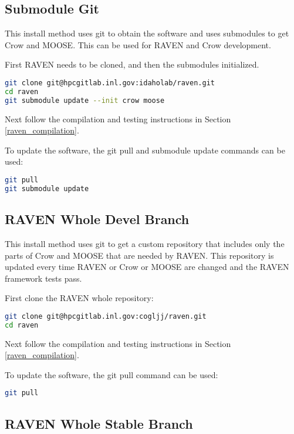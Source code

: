 \subsection{Submodule Git}
\label{submodule_git}

This install method uses git to obtain the software and uses
submodules to get Crow and MOOSE.  This can be used for RAVEN and Crow
development.

First RAVEN needs to be cloned, and then the submodules initialized.

\begin{lstlisting}[language=bash]
git clone git@hpcgitlab.inl.gov:idaholab/raven.git
cd raven
git submodule update --init crow moose
\end{lstlisting}

Next follow the compilation and testing instructions in Section \ref{raven_compilation}.

To update the software, the git pull and submodule update commands can
be used:

\begin{lstlisting}[language=bash]
git pull
git submodule update
\end{lstlisting}


\subsection{RAVEN Whole Devel Branch}
\label{raven_whole_devel}

This install method uses git to get a custom repository that includes
only the parts of Crow and MOOSE that are needed by RAVEN.  This
repository is updated every time RAVEN or Crow or MOOSE are changed
and the RAVEN framework tests pass.

First clone the RAVEN whole repository:

\begin{lstlisting}[language=bash]
git clone git@hpcgitlab.inl.gov:cogljj/raven.git
cd raven
\end{lstlisting}

Next follow the compilation and testing instructions in Section \ref{raven_compilation}.

To update the software, the git pull command can be used:

\begin{lstlisting}[language=bash]
git pull
\end{lstlisting}

\subsection{RAVEN Whole Stable Branch}
\label{raven_whole_stable}

